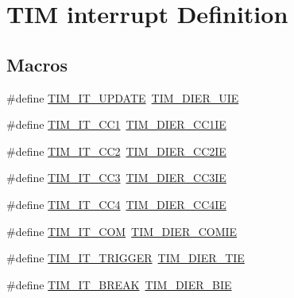 \hypertarget{group___t_i_m___interrupt__definition}{}\section{T\+IM interrupt Definition}
\label{group___t_i_m___interrupt__definition}
\subsection*{Macros}
\begin{DoxyCompactItemize}
\item 
\#define \hyperlink{group___t_i_m___interrupt__definition_ga6a48ecf88cae0402ff084202bfdd4f8e}{T\+I\+M\+\_\+\+I\+T\+\_\+\+U\+P\+D\+A\+TE}~\hyperlink{group___peripheral___registers___bits___definition_ga5c6d3e0495e6c06da4bdd0ad8995a32b}{T\+I\+M\+\_\+\+D\+I\+E\+R\+\_\+\+U\+IE}
\item 
\#define \hyperlink{group___t_i_m___interrupt__definition_ga02267a938ab4722c5013fffa447cf5a6}{T\+I\+M\+\_\+\+I\+T\+\_\+\+C\+C1}~\hyperlink{group___peripheral___registers___bits___definition_ga1ba7f7ca97eeaf6cc23cd6765c6bf678}{T\+I\+M\+\_\+\+D\+I\+E\+R\+\_\+\+C\+C1\+IE}
\item 
\#define \hyperlink{group___t_i_m___interrupt__definition_ga60f6b6c424b62ca58d3fafd8f5955e4f}{T\+I\+M\+\_\+\+I\+T\+\_\+\+C\+C2}~\hyperlink{group___peripheral___registers___bits___definition_ga757c59b690770adebf33e20d3d9dec15}{T\+I\+M\+\_\+\+D\+I\+E\+R\+\_\+\+C\+C2\+IE}
\item 
\#define \hyperlink{group___t_i_m___interrupt__definition_ga6aef020aebafd9e585283fbbaf8b841f}{T\+I\+M\+\_\+\+I\+T\+\_\+\+C\+C3}~\hyperlink{group___peripheral___registers___bits___definition_ga4edf003f04bcf250bddf5ed284201c2e}{T\+I\+M\+\_\+\+D\+I\+E\+R\+\_\+\+C\+C3\+IE}
\item 
\#define \hyperlink{group___t_i_m___interrupt__definition_ga1dce7f1bc32a258f2964cb7c05f413a6}{T\+I\+M\+\_\+\+I\+T\+\_\+\+C\+C4}~\hyperlink{group___peripheral___registers___bits___definition_ga6ad0f562a014572793b49fe87184338b}{T\+I\+M\+\_\+\+D\+I\+E\+R\+\_\+\+C\+C4\+IE}
\item 
\#define \hyperlink{group___t_i_m___interrupt__definition_gaeb7eff6c39922814e7ee47c0820c3d9f}{T\+I\+M\+\_\+\+I\+T\+\_\+\+C\+OM}~\hyperlink{group___peripheral___registers___bits___definition_gade8a374e04740aac1ece248b868522fe}{T\+I\+M\+\_\+\+D\+I\+E\+R\+\_\+\+C\+O\+M\+IE}
\item 
\#define \hyperlink{group___t_i_m___interrupt__definition_ga2a577f2eee61f101cf551d86c4d73333}{T\+I\+M\+\_\+\+I\+T\+\_\+\+T\+R\+I\+G\+G\+ER}~\hyperlink{group___peripheral___registers___bits___definition_gaa755fef2c4e96c63f2ea1cd9a32f956a}{T\+I\+M\+\_\+\+D\+I\+E\+R\+\_\+\+T\+IE}
\item 
\#define \hyperlink{group___t_i_m___interrupt__definition_ga351a8f27975e0af87f4bb37a4feaa636}{T\+I\+M\+\_\+\+I\+T\+\_\+\+B\+R\+E\+AK}~\hyperlink{group___peripheral___registers___bits___definition_ga1fcb0d6d9fb7486a5901032fd81aef6a}{T\+I\+M\+\_\+\+D\+I\+E\+R\+\_\+\+B\+IE}
\end{DoxyCompactItemize}


